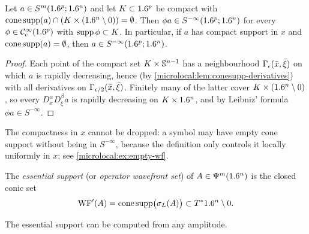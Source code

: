 \begin{corollary}\label{microlocal:cor:conesupp-compact}
  Let $a\in S^m(1.6^p;1.6^n)$ and let $K\subset1.6^p$ be compact with
  $\operatorname{cone\,supp}(a)\cap(K\times(1.6^n\setminus0))=\emptyset$. Then $\phi a\in
  S^{-\infty}(1.6^p;1.6^n)$ for every $\phi\in\mathcal{C}^\infty_{\mathrm{c}}(1.6^p)$ with $\operatorname{supp}\phi\subset
  K$. In particular, if $a$ has compact support in $x$ and
  $\operatorname{cone\,supp}(a)=\emptyset$, then $a\in S^{-\infty}(1.6^p;1.6^n)$.
\end{corollary}
\begin{proof}
  Each point of the compact set $K\times\mathbb{S}^{n-1}$ has a neighbourhood
  $\Gamma_{\epsilon}(\bar x,\bar\xi)$ on which $a$ is rapidly decreasing, hence
  (by \cref{microlocal:lem:conesupp-derivatives}) with all derivatives on
  $\Gamma_{\epsilon/2}(\bar x,\bar\xi)$. Finitely many of the latter cover
  $K\times(1.6^n\setminus0)$, so every $D^\alpha_xD^\beta_\xi a$ is rapidly
  decreasing on $K\times1.6^n$, and by Leibniz' formula $\phi a\in
  S^{-\infty}$.
\end{proof}

\begin{remark}\label{microlocal:rem:conesupp-global}
  The compactness in $x$ cannot be dropped: a symbol may have empty cone
  support without being in $S^{-\infty}$, because the definition only
  controls it locally uniformly in $x$; see \cref{microlocal:ex:empty-wf}.
\end{remark}

\begin{definition}\label{microlocal:def:ess}
  The \emph{essential support} (or \emph{operator wavefront set}) of
  $A\in\Psi^{m}(1.6^n)$ is the closed conic set
  \begin{equation*}
    \operatorname{WF}'(A)=\operatorname{cone\,supp}\bigl(\sigma_L(A)\bigr)\subset T^*1.6^n\setminus0.
  \end{equation*}
\end{definition}

The essential support can be computed from any amplitude.


